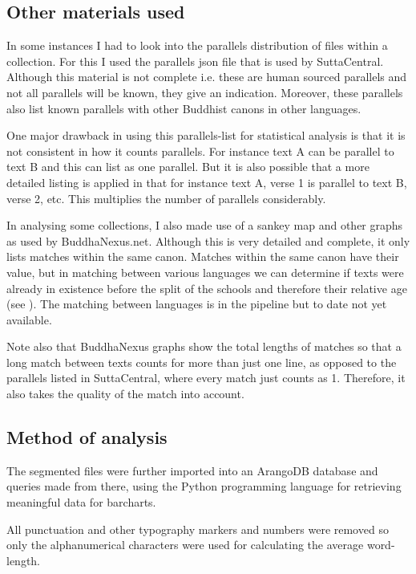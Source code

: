 \subsection{Other materials used}
In some instances I had to look into the parallels distribution of files within a collection. For this I used the parallels json file that is used by SuttaCentral. Although this material is not complete i.e. these are human sourced parallels and not all parallels will be known, they give an indication. Moreover, these parallels also list known parallels with other Buddhist canons in other languages.

One major drawback in using this parallels-list for statistical analysis is that it is not consistent in how it counts parallels. For instance text A can be parallel to text B and this can list as one parallel. But it is also possible that a more detailed listing is applied in that for instance text A, verse 1 is parallel to text B, verse 2, etc. This multiplies the number of parallels considerably. 

In analysing some collections, I also made use of a sankey map and other graphs as used by BuddhaNexus.net. Although this is very detailed and complete, it only lists matches within the same canon. Matches within the same canon have their value, but in matching between various languages we can determine if texts were already in existence before the split of the schools and therefore their relative age (see \citep{sujatobrahmali}). The matching between languages is in the pipeline but to date not yet available. 

Note also that BuddhaNexus graphs show the total lengths of matches so that a long match between texts counts for more than just one line, as opposed to the parallels listed in SuttaCentral, where every match just counts as 1. Therefore, it also takes the quality of the match into account.

\subsection{Method of analysis}
The segmented files were further imported into an ArangoDB database and queries made from there, using the Python programming language for retrieving meaningful data for barcharts.

All punctuation and other typography markers and numbers were removed so only the alphanumerical characters were used for calculating the average word-length.
